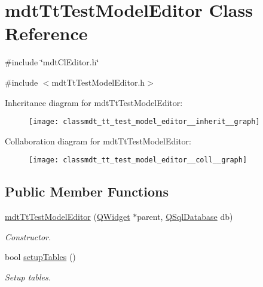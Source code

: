 \hypertarget{classmdt_tt_test_model_editor}{\section{mdt\-Tt\-Test\-Model\-Editor Class Reference}
\label{classmdt_tt_test_model_editor}
}


\#include \char`\"{}mdt\-Cl\-Editor.\-h\char`\"{}  




{\ttfamily \#include $<$mdt\-Tt\-Test\-Model\-Editor.\-h$>$}



Inheritance diagram for mdt\-Tt\-Test\-Model\-Editor\-:\nopagebreak
\begin{figure}[H]
\begin{center}
\leavevmode
\texttt{[image: classmdt\_tt\_test\_model\_editor\_\_inherit\_\_graph]}
\end{center}
\end{figure}


Collaboration diagram for mdt\-Tt\-Test\-Model\-Editor\-:\nopagebreak
\begin{figure}[H]
\begin{center}
\leavevmode
\texttt{[image: classmdt\_tt\_test\_model\_editor\_\_coll\_\_graph]}
\end{center}
\end{figure}
\subsection*{Public Member Functions}
\begin{DoxyCompactItemize}
\item 
\hyperlink{classmdt_tt_test_model_editor_ab61b24a5fe035bfec847ee09762e896d}{mdt\-Tt\-Test\-Model\-Editor} (\hyperlink{class_q_widget}{Q\-Widget} $\ast$parent, \hyperlink{class_q_sql_database}{Q\-Sql\-Database} db)
\begin{DoxyCompactList}\small\item\em Constructor. \end{DoxyCompactList}\item 
bool \hyperlink{classmdt_tt_test_model_editor_acb871c3218f3d458b5f9ba5e49c74df9}{setup\-Tables} ()
\begin{DoxyCompactList}\small\item\em Setup tables. \end{DoxyCompactList}\end{DoxyCompactItemize}
